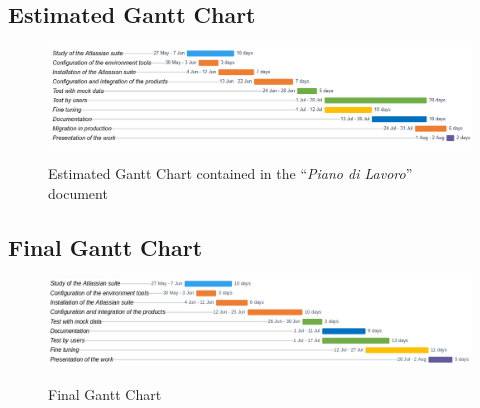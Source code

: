 \begin{landscape}
	\vspace*{\fill}
	\section{Estimated Gantt Chart}
	\label{gantt_1}
	\begin{figure}[H]
		\centering
		\includegraphics[width=22cm]{resources/work_plan_gantt}\\
		\caption{Estimated Gantt Chart contained in the ``\textit{Piano di Lavoro}'' document}
	\end{figure}
	\vspace*{\fill}
\end{landscape}
\newpage
\begin{landscape}
	\vspace*{\fill}
	\section{Final Gantt Chart}
	\label{gantt_2}
	\begin{figure}[H]
		\centering
		\includegraphics[width=22cm]{resources/revised_gantt}\\
		\caption{Final Gantt Chart}
	\end{figure}
	\vspace*{\fill}
\end{landscape}